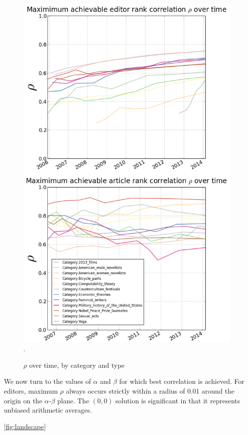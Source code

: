 \begin{figure}[!t]
\centering
\includegraphics[width=0.9\columnwidth]{Figures/rho_combined.png}.
\caption{$\rho$ over time, by category and type}
\label{fig:rhotime}
\end{figure}

We now turn to the values of $\alpha$ and $\beta$ for which best correlation is achieved.
For editors, maximum $\rho$ always occurs strictly within a radius of 0.01 around the origin on the  $\alpha$-$\beta$ plane. The $(0,0)$ solution is significant in that it represents unbiased arithmetic averages.

\ref{fig:landscape}

